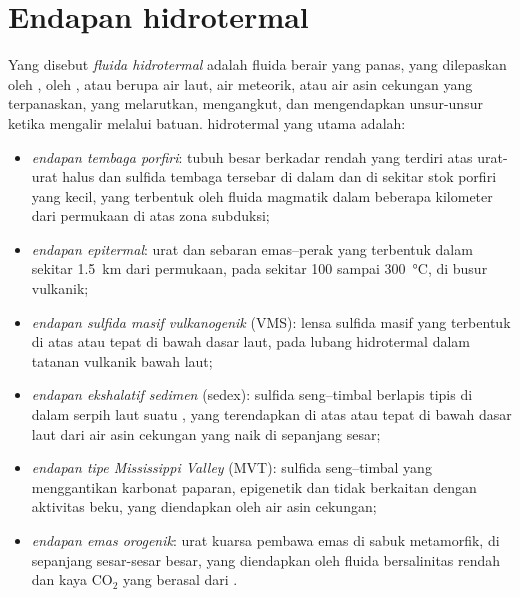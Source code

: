 \section{Endapan hidrotermal}\label{sec:b2:ore-deposits:hydrothermal}

\begin{definition}\label{def:b2:ore-deposits:hydrothermal}
Yang disebut \emph{fluida hidrotermal} adalah fluida berair yang panas, yang dilepaskan oleh ,
oleh , atau berupa air laut, air meteorik, atau air asin cekungan yang terpanaskan, yang melarutkan,
mengangkut, dan mengendapkan unsur-unsur ketika mengalir melalui batuan.  hidrotermal yang utama
adalah:
\begin{itemize}
  \item \emph{endapan tembaga porfiri}: tubuh besar berkadar rendah
        yang terdiri atas urat-urat halus dan sulfida tembaga tersebar di dalam dan di sekitar stok porfiri yang kecil, yang terbentuk oleh
        fluida magmatik dalam beberapa kilometer dari permukaan di atas zona subduksi;
  \item \emph{endapan epitermal}: urat dan sebaran emas--perak
        yang terbentuk dalam sekitar \qty{1.5}{km} dari permukaan, pada sekitar 100 sampai
        \qty{300}{\celsius}, di busur vulkanik;
  \item \emph{endapan sulfida masif vulkanogenik}
        (VMS): lensa sulfida masif yang terbentuk di atas atau tepat di bawah dasar laut, pada lubang
        hidrotermal dalam tatanan vulkanik bawah laut;
  \item \emph{endapan ekshalatif sedimen} (sedex):
        sulfida seng--timbal berlapis tipis di dalam serpih laut suatu , yang terendapkan di atas atau tepat
        di bawah dasar laut dari air asin cekungan yang naik di sepanjang sesar;
  \item \emph{endapan tipe Mississippi Valley} (MVT):
        sulfida seng--timbal yang menggantikan karbonat paparan, epigenetik dan tidak berkaitan dengan aktivitas
        beku, yang diendapkan oleh air asin cekungan;
  \item \emph{endapan emas orogenik}: urat kuarsa pembawa emas di
        sabuk metamorfik, di sepanjang sesar-sesar besar, yang diendapkan oleh fluida bersalinitas rendah dan kaya CO$_2$ yang
        berasal dari .
\end{itemize}
\end{definition}

